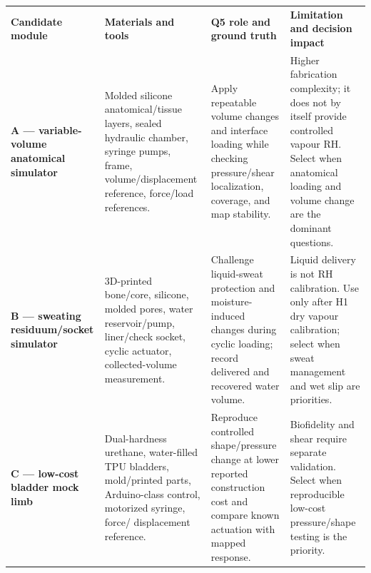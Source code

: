 \begingroup
\fontsize{7.55}{8.85}\selectfont
\setlength{\tabcolsep}{2.5pt}\renewcommand{\arraystretch}{1.04}
\begin{tabularx}{\linewidth}{>{\raggedright\arraybackslash\bfseries\color{AUBRed}}p{2.0cm}Y Y Y}
\color{white}\textbf{Candidate module} & \color{white}\textbf{Materials and tools} &
\color{white}\textbf{Q5 role and ground truth} &
\color{white}\textbf{Limitation and decision impact} \\
A --- variable-volume anatomical simulator & Molded silicone anatomical/tissue
layers, sealed hydraulic chamber, syringe pumps, frame, volume/displacement
reference, force/load references. & Apply repeatable volume changes and
interface loading while checking pressure/shear localization, coverage, and
map stability. & Higher fabrication complexity; it does not by itself provide
controlled vapour RH. Select when anatomical loading and volume change are the
dominant questions. \\
B --- sweating residuum/socket simulator & 3D-printed bone/core, silicone,
molded pores, water reservoir/pump, liner/check socket, cyclic actuator,
collected-volume measurement. & Challenge liquid-sweat protection and
moisture-induced changes during cyclic loading; record delivered and recovered
water volume. & Liquid delivery is not RH calibration. Use only after H1 dry
vapour calibration; select when sweat management and wet slip are priorities. \\
C --- low-cost bladder mock limb & Dual-hardness urethane, water-filled TPU
bladders, mold/printed parts, Arduino-class control, motorized syringe, force/
displacement reference. & Reproduce controlled shape/pressure change at lower
reported construction cost and compare known actuation with mapped response. &
Biofidelity and shear require separate validation. Select when reproducible
low-cost pressure/shape testing is the priority. \\
\end{tabularx}
\endgroup

